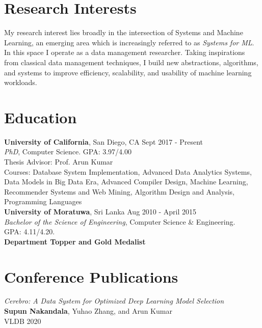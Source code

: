 \documentclass[margin]{res}
\begin{document}

\address{Phone: (+1) 812-558-6888\\ Email: snakanda@eng.ucsd.edu\\ Web: \href{https://scnakandala.github.io}{scnakandala.github.io}}
\address{3232 EBU3B CSE\\9500 Gilman Drive\\La Jolla, CA 92093}


\begin{resume}
\vspace{-2mm}
\section{Research Interests}
My research interest lies broadly in the intersection of Systems and Machine Learning, an emerging area which is increasingly referred to as \textit{Systems for ML}. In this space I operate as a data management researcher.
Taking inspirations from classical data management techniques, I build new abstractions, algorithms, and systems to improve efficiency, scalability, and usability of machine learning workloads.


\section{Education}
\textbf{University of California}, San Diego, CA \hfill Sept 2017 - Present
\\ 
{\sl PhD}, Computer Science. GPA: 3.97/4.00 
\\
Thesis Advisor: Prof. Arun Kumar\\
Courses: Database System Implementation, Advanced Data Analytics Systems, Data Models in Big Data Era, Advanced Compiler Design, Machine Learning, Recommender Systems and Web Mining, Algorithm Design and Analysis, Programming Languages
\vspace{4mm}
\\
\textbf{University of Moratuwa}, Sri Lanka \hfill Aug 2010 - April 2015
\\
{\sl Bachelor of the Science of Engineering}, Computer Science \& Engineering. \\ GPA: 4.11/4.20.
\\ \textbf{Department Topper and Gold Medalist}



\section{Conference Publications}
\par
\textit{Cerebro: A Data System for Optimized Deep Learning Model Selection} \\
\textbf{Supun Nakandala}, Yuhao Zhang, and Arun Kumar\\
VLDB 2020


\end{resume}
\end{document}

